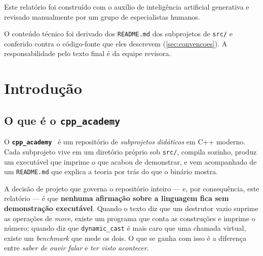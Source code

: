 
\begin{aviso}
Este relatório foi construído com o auxílio de inteligência artificial generativa
e revisado manualmente por um grupo de especialistas humanos.

O conteúdo técnico foi derivado dos \texttt{README.md} dos subprojetos de
\texttt{src/} e conferido contra o código-fonte que eles descrevem
(\cref{sec:convencoes}). A responsabilidade pelo texto final é da equipe
revisora.
\end{aviso}

\newpage

\section{Introdução}
\label{sec:introducao}

\subsection{O que é o \texttt{cpp\_academy}}
\label{sec:o-que-e}

O \textbf{\texttt{cpp\_academy}}~\cite{cppacademy} é um repositório de
\emph{subprojetos didáticos} em C++ moderno. Cada subprojeto vive em um
diretório próprio sob \texttt{src/}, compila sozinho, produz um executável que
imprime o que acabou de demonstrar, e vem acompanhado de um \texttt{README.md}
que explica a teoria por trás do que o binário mostra.

A decisão de projeto que governa o repositório inteiro --- e, por consequência,
este relatório --- é que \textbf{nenhuma afirmação sobre a linguagem fica sem
demonstração executável}. Quando o texto diz que um destrutor vazio suprime as
operações de \emph{move}, existe um programa que conta as construções e imprime
o número; quando diz que \texttt{dynamic\_cast} é mais caro que uma chamada
virtual, existe um \emph{benchmark} que mede os dois. O que se ganha com isso é
a diferença entre \emph{saber de ouvir falar} e \emph{ter visto acontecer}.

